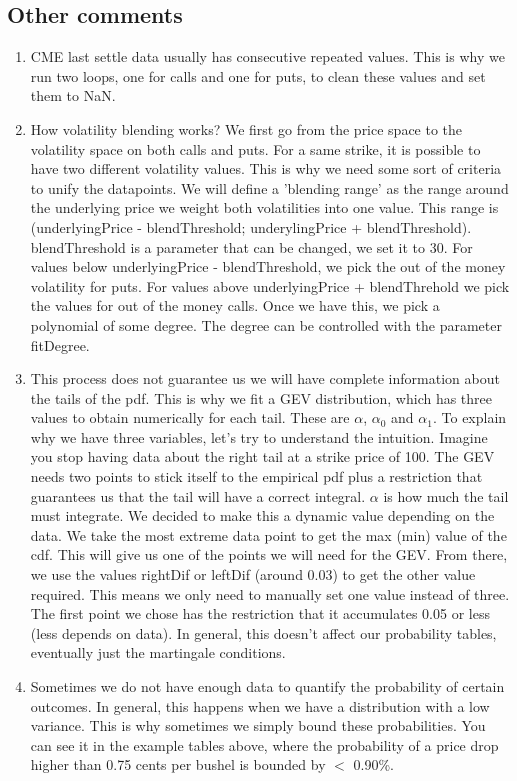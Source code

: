 \documentclass[10pt,a4paper]{book}
\begin{document}
\subsection{Other comments}
\begin{enumerate}
  \item CME last settle data usually has consecutive repeated values. This is why we run two loops, one for calls and one for puts, to clean these values and set them to NaN.
  \item How volatility blending works?
  We first go from the price space to the volatility space on both calls and puts. For a same strike, it is possible to have two different volatility values. This is why we need some sort of criteria to unify the datapoints. We will define a 'blending range' as the range around the underlying price we weight both volatilities into one value. This range is (underlyingPrice - blendThreshold; underylingPrice + blendThreshold). blendThreshold is a parameter that can be changed, we set it to 30. For values below underlyingPrice - blendThreshold, we pick the out of the money volatility for puts. For values above underlyingPrice + blendThrehold we pick the values for out of the money calls.
  Once we have this, we pick a polynomial of some degree. The degree can be controlled with the parameter fitDegree.
  \item This process does not guarantee us we will have complete information about the tails of the pdf. This is why we fit a GEV distribution, which has three values to obtain numerically for each tail. These are $\alpha$, $\alpha_0$ and $\alpha_1$. To explain why we have three variables, let's try to understand the intuition. Imagine you stop having data about the right tail at a strike price of 100. The GEV needs two points to stick itself to the empirical pdf plus a restriction that guarantees us that the tail will have a correct integral. $\alpha$ is how much the tail must integrate. We decided to make this a dynamic value depending on the data. We take the most extreme data point to get the max (min) value of the cdf. This will give us one of the points we will need for the GEV. From there, we use the values rightDif or leftDif (around 0.03) to get the other value required. This means we only need to manually set one value instead of three. The first point we chose has the restriction that it accumulates 0.05 or less (less depends on data). In general, this doesn't affect our probability tables, eventually just the martingale conditions.
  \item Sometimes we do not have enough data to quantify the probability of certain outcomes. In general, this happens when we have a distribution with a low variance. This is why sometimes we simply bound these probabilities. You can see it in the example tables above, where the probability of a price drop higher than 0.75 cents per bushel is bounded by $<$ 0.90\%.

\end{enumerate}
\end{document}
